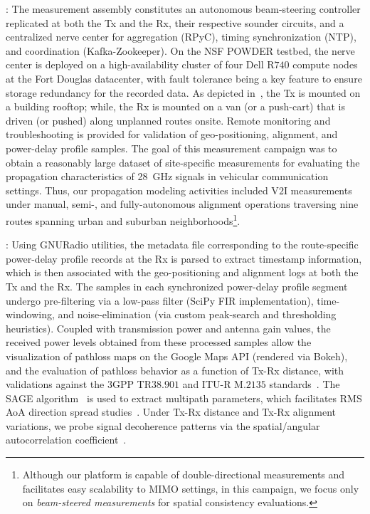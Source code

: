 \documentclass[10pt, twocolumn]{IEEEtran}
\begin{document}
: The measurement assembly constitutes an autonomous beam-steering controller replicated at both the Tx and the Rx, their respective sounder circuits, and a centralized nerve center for aggregation (RPyC), timing synchronization (NTP), and coordination (Kafka-Zookeeper). On the NSF POWDER testbed, the nerve center is deployed on a high-availability cluster of four Dell R$740$ compute nodes at the Fort Douglas datacenter, with fault tolerance being a key feature to ensure storage redundancy for the recorded data. As depicted in~\cite{SPAVE_ICC}, the Tx is mounted on a building rooftop; while, the Rx is mounted on a van (or a push-cart) that is driven (or pushed) along unplanned routes onsite. Remote monitoring and troubleshooting is provided for validation of geo-positioning, alignment, and power-delay profile samples. The goal of this measurement campaign was to obtain a reasonably large dataset of site-specific measurements for evaluating the propagation characteristics of \SI{28}{\giga\hertz} signals in vehicular communication settings. Thus, our propagation modeling activities included V$2$I measurements under manual, semi-, and fully-autonomous alignment operations traversing nine routes spanning urban and suburban neighborhoods\footnote{Although our platform is capable of double-directional measurements and facilitates easy scalability to MIMO settings, in this campaign, we focus only on \emph{beam-steered measurements} for spatial consistency evaluations.}.

: Using GNURadio utilities, the metadata file corresponding to the route-specific power-delay profile records at the Rx is parsed to extract timestamp information, which is then associated with the geo-positioning and alignment logs at both the Tx and the Rx. The samples in each synchronized power-delay profile segment undergo pre-filtering via a low-pass filter (SciPy FIR implementation), time-windowing, and noise-elimination (via custom peak-search and thresholding heuristics). Coupled with transmission power and antenna gain values, the received power levels obtained from these processed samples allow the visualization of pathloss maps on the Google Maps API (rendered via Bokeh), and the evaluation of pathloss behavior as a function of Tx-Rx distance, with validations against the $3$GPP TR$38.901$ and ITU-R M$.2135$ standards~\cite{MacCartneyModelsOverview}. The SAGE algorithm~\cite{SAGE} is used to extract multipath parameters, which facilitates RMS AoA direction spread studies~\cite{Indoor60G}. Under Tx-Rx distance and Tx-Rx alignment variations, we probe signal decoherence patterns via the spatial/angular autocorrelation coefficient~\cite{MacCartneySpatialStatistics}.
\vspace{-3mm}
\end{document}
